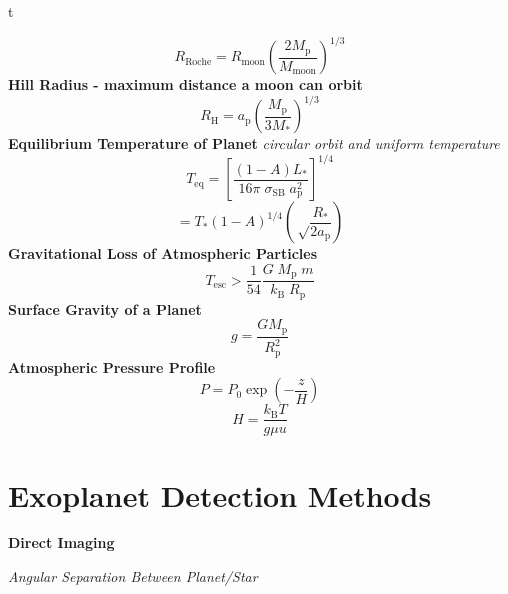 \documentclass{spy}
\begin{document}
\begin{center}t
\end{center}
\begin{equation}
R_\mathrm{Roche} = R_\mathrm{moon} \left( \frac{2 M_\mathrm{p}}{M_\mathrm{moon}} \right)^{1/3}
\end{equation}
\textbf {Hill Radius - maximum distance a moon can orbit}
\begin{equation}
R_\mathrm{H} = a_\mathrm{p} \left( \frac{M_\mathrm{p}}{3M_\mathrm{*}} \right)^{1/3}
\end{equation}
\textbf {Equilibrium Temperature of Planet}
\textit {circular orbit and uniform temperature}
\begin{equation}
T_\mathrm{eq} = \left[ \frac {\left(1-A\right)L_\mathrm{*}} {16 \pi \; \sigma_\mathrm{SB} \; a_\mathrm{p}^2} \right]^{1/4} 
\end{equation}
\begin{equation}
= T_\mathrm{*} \left(1-A\right)^{1/4} \left(\sqrt \frac {R_\mathrm{*}}{2a_\mathrm{p}} \right)
\end{equation}
\textbf {Gravitational Loss of Atmospheric Particles}
\begin{equation}
T_\mathrm{esc} > \frac {1}{54} \frac {G \; M_\mathrm{p} \; m}{k_\mathrm{B} \; R_\mathrm{p}}
\end{equation}
\textbf {Surface Gravity of a Planet}
\begin{equation}
g = \frac{G M_\mathrm{p}}{R^2_\mathrm{p}}
\end{equation}
\textbf {Atmospheric Pressure Profile}
\begin{equation}
P = P_\mathrm{0} \exp \left( -\frac{z}{H} \right)
\end{equation}
\begin{equation}
H = \frac{k_\mathrm{B}T}{g \mu u}
\end{equation}
\newpage

\section {Exoplanet Detection Methods}
\textbf{Direct Imaging}

\textit{Angular Separation Between Planet/Star}
\end{document}
